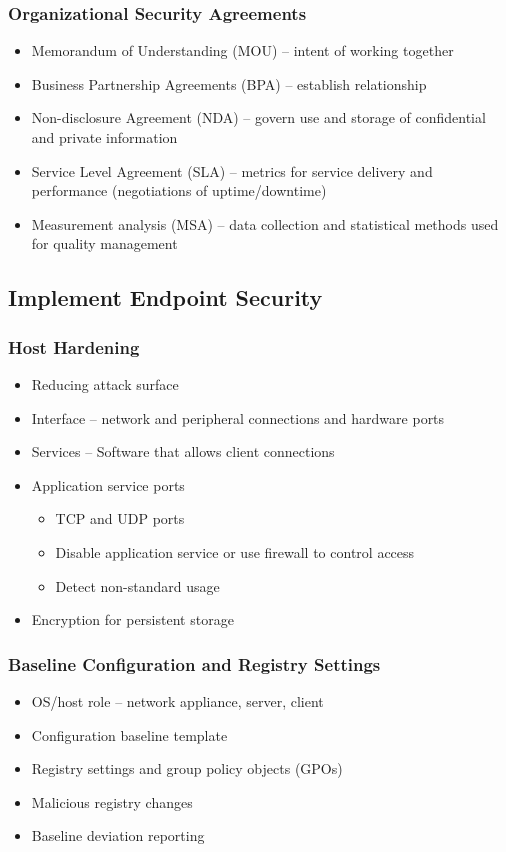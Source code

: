 		\subsubsection {Organizational Security Agreements}
			\begin{itemize}
				\item Memorandum of Understanding (MOU) -- intent of working together
				\item Business Partnership Agreements (BPA) -- establish relationship
				\item Non-disclosure Agreement (NDA) -- govern use and storage of
					confidential and private information
				\item Service Level Agreement (SLA) -- metrics for service delivery and
					performance (negotiations of uptime/downtime)
				\item Measurement analysis (MSA) -- data collection and statistical
					methods used for quality management
			\end{itemize}
	\subsection {Implement Endpoint Security}
		\subsubsection {Host Hardening}
			\begin{itemize}
				\item Reducing attack surface
				\item Interface -- network and peripheral connections and hardware ports
				\item Services -- Software that allows client connections
				\item Application service ports
					\begin{itemize}
						\item TCP and UDP ports
						\item Disable application service or use firewall to control
							access
						\item Detect non-standard usage
					\end{itemize}
				\item Encryption for persistent storage
			\end{itemize}
		\subsubsection {Baseline Configuration and Registry Settings}
			\begin{itemize}
				\item OS/host role -- network appliance, server, client
				\item Configuration baseline template
				\item Registry settings and group policy objects (GPOs)
				\item Malicious registry changes
				\item Baseline deviation reporting
			\end{itemize}
